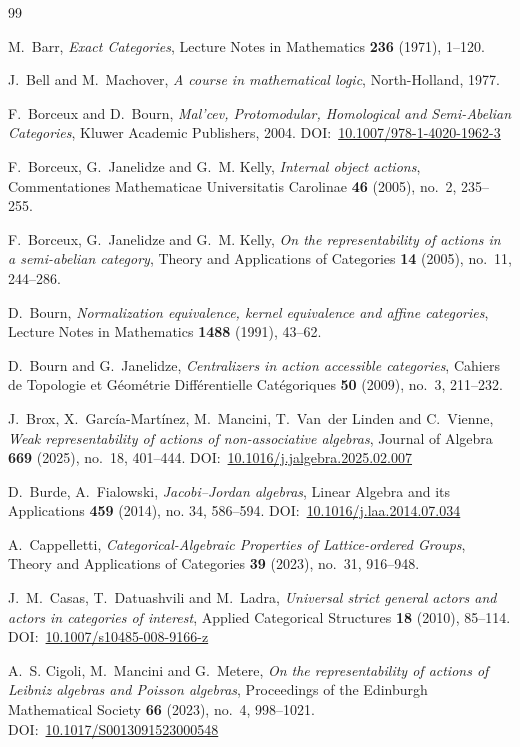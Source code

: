 \documentclass[reqno,a4paper]{amsart}
\renewcommand{\doi}[1]{DOI:~\href{https://doi.org/#1}{#1}}
\theoremstyle{plain}
\theoremstyle{definition}
\theoremstyle{remark}
\numberwithin{equation}{section}
\begin{document}
\begin{thebibliography}{99}

M.~Barr, \emph{Exact Categories}, Lecture Notes in Mathematics \textbf{236} (1971), 1--120.

J.~Bell and M.~Machover, \emph{A course in mathematical logic}, North-Holland, 1977.

F.~Borceux and D.~Bourn, \emph{Mal'cev, Protomodular, Homological and Semi-Abelian Categories}, Kluwer Academic Publishers, 2004. \doi{10.1007/978-1-4020-1962-3}

F.~Borceux, G.~Janelidze and G.~M. Kelly, \emph{Internal object actions}, Commentationes Mathematicae Universitatis Carolinae \textbf{46} (2005), no.~2, 235--255.

F.~Borceux, G.~Janelidze and G.~M. Kelly, \emph{On the representability of actions in a semi-abelian category}, Theory and Applications of Categories \textbf{14} (2005), no.~11, 244--286.

D.~Bourn, \emph{Normalization equivalence, kernel equivalence and affine categories}, Lecture Notes in Mathematics \textbf{1488} (1991), 43--62.

D.~Bourn and G.~Janelidze, \emph{Centralizers in action accessible categories}, Cahiers de Topologie et G\'eom\'etrie Diff\'erentielle Cat\'egoriques \textbf{50} (2009), no.~3, 211--232.

J.~Brox, X.~García-Martínez, M.~Mancini, T.~Van~der Linden and C.~Vienne, \emph{Weak representability of actions of non-associative algebras}, Journal of Algebra \textbf{669} (2025), no.~18, 401--444. \doi{10.1016/j.jalgebra.2025.02.007}

D.~Burde, A.~Fialowski, \emph{Jacobi–Jordan algebras}, Linear Algebra and its Applications \textbf{459} (2014), no. 34, 586--594. \doi{10.1016/j.laa.2014.07.034}

A.~Cappelletti, \emph{Categorical-Algebraic Properties of Lattice-ordered Groups}, Theory and Applications of Categories \textbf{39} (2023), no.~31, 916--948.

J.~M.~Casas, T.~Datuashvili and M.~Ladra, \emph{Universal strict general actors and actors in categories of interest}, Applied Categorical Structures \textbf{18} (2010), 85--114. \doi{10.1007/s10485-008-9166-z}

A.~S. Cigoli, M.~Mancini and G.~Metere, \emph{On the representability of actions of Leibniz algebras and Poisson algebras}, Proceedings of the Edinburgh Mathematical Society \textbf{66} (2023), no.~4, 998--1021. \doi{10.1017/S0013091523000548}


\end{thebibliography}
\end{document}
